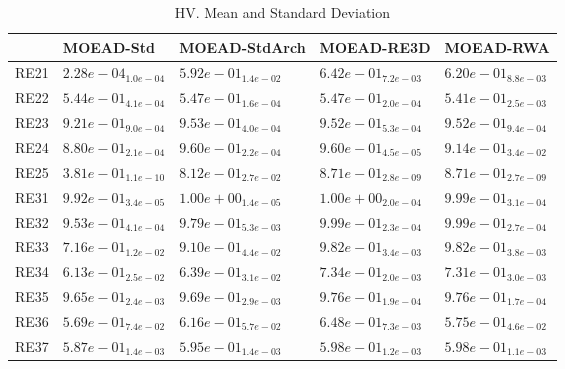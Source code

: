 \documentclass{article}
\begin{document}
\begin{table}
\caption{HV. Mean and Standard Deviation}
\label{table: HV}
\centering
\begin{scriptsize}
\begin{tabular}{lllll}
\hline & MOEAD-Std & MOEAD-StdArch & MOEAD-RE3D &  MOEAD-RWA\\
\hline 
RE21 & $  2.28e-04_{ 1.0e-04}$ & $  5.92e-01_{ 1.4e-02}$ & \cellcolor{gray95}$  6.42e-01_{ 7.2e-03}$ & \cellcolor{gray25}$  6.20e-01_{ 8.8e-03}$ \\
RE22 & $  5.44e-01_{ 4.1e-04}$ & \cellcolor{gray95}$  5.47e-01_{ 1.6e-04}$ & \cellcolor{gray25}$  5.47e-01_{ 2.0e-04}$ & $  5.41e-01_{ 2.5e-03}$ \\
RE23 & $  9.21e-01_{ 9.0e-04}$ & \cellcolor{gray95}$  9.53e-01_{ 4.0e-04}$ & \cellcolor{gray25}$  9.52e-01_{ 5.3e-04}$ & $  9.52e-01_{ 9.4e-04}$ \\
RE24 & $  8.80e-01_{ 2.1e-04}$ & \cellcolor{gray25}$  9.60e-01_{ 2.2e-04}$ & \cellcolor{gray95}$  9.60e-01_{ 4.5e-05}$ & $  9.14e-01_{ 3.4e-02}$ \\
RE25 & $  3.81e-01_{ 1.1e-10}$ & $  8.12e-01_{ 2.7e-02}$ & \cellcolor{gray25}$  8.71e-01_{ 2.8e-09}$ & \cellcolor{gray95}$  8.71e-01_{ 2.7e-09}$ \\
RE31 & $  9.92e-01_{ 3.4e-05}$ & \cellcolor{gray95}$  1.00e+00_{ 1.4e-05}$ & \cellcolor{gray25}$  1.00e+00_{ 2.0e-04}$ & $  9.99e-01_{ 3.1e-04}$ \\
RE32 & $  9.53e-01_{ 4.1e-04}$ & $  9.79e-01_{ 5.3e-03}$ & \cellcolor{gray25}$  9.99e-01_{ 2.3e-04}$ & \cellcolor{gray95}$  9.99e-01_{ 2.7e-04}$ \\
RE33 & $  7.16e-01_{ 1.2e-02}$ & $  9.10e-01_{ 4.4e-02}$ & \cellcolor{gray25}$  9.82e-01_{ 3.4e-03}$ & \cellcolor{gray95}$  9.82e-01_{ 3.8e-03}$ \\
RE34 & $  6.13e-01_{ 2.5e-02}$ & $  6.39e-01_{ 3.1e-02}$ & \cellcolor{gray95}$  7.34e-01_{ 2.0e-03}$ & \cellcolor{gray25}$  7.31e-01_{ 3.0e-03}$ \\
RE35 & $  9.65e-01_{ 2.4e-03}$ & $  9.69e-01_{ 2.9e-03}$ & \cellcolor{gray25}$  9.76e-01_{ 1.9e-04}$ & \cellcolor{gray95}$  9.76e-01_{ 1.7e-04}$ \\
RE36 & $  5.69e-01_{ 7.4e-02}$ & \cellcolor{gray25}$  6.16e-01_{ 5.7e-02}$ & \cellcolor{gray95}$  6.48e-01_{ 7.3e-03}$ & $  5.75e-01_{ 4.6e-02}$ \\
RE37 & $  5.87e-01_{ 1.4e-03}$ & $  5.95e-01_{ 1.4e-03}$ & \cellcolor{gray95}$  5.98e-01_{ 1.2e-03}$ & \cellcolor{gray25}$  5.98e-01_{ 1.1e-03}$ \\

\end{tabular}
\end{scriptsize}
\end{table}
\end{document}
